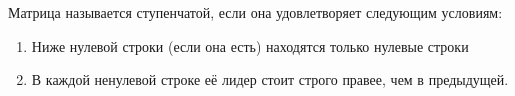 \newpage
\begin{df}
  Матрица называется ступенчатой, если она удовлетворяет следующим условиям:
  \begin{enumerate}
     \item Ниже нулевой строки (если она есть) находятся только нулевые строки
     \item В каждой ненулевой строке её лидер стоит строго правее, чем в предыдущей.
  \end{enumerate}
\end{df}
  

